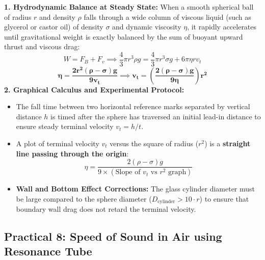 \documentclass[10pt,twoside,openright]{book}
\begin{document}
\begin{conceptbox}
\textbf{1. Hydrodynamic Balance at Steady State:}
When a smooth spherical ball of radius $r$ and density $\rho$ falls through a wide column of viscous liquid (such as glycerol or castor oil) of density $\sigma$ and dynamic viscosity $\eta$, it rapidly accelerates until gravitational weight is exactly balanced by the sum of buoyant upward thrust and viscous drag:
\begin{equation}
  W = F_B + F_v \implies \frac{4}{3}\pi r^3 \rho g = \frac{4}{3}\pi r^3 \sigma g + 6\pi \eta r v_t
\end{equation}
\begin{equation}
  \mathbf{\eta = \frac{2 r^2 (\rho - \sigma) g}{9 v_t}} \implies \mathbf{v_t = \left(\frac{2(\rho - \sigma)g}{9\eta}\right)r^2}
\end{equation}
\textbf{2. Graphical Calculus and Experimental Protocol:}
\begin{itemize}
  \item The fall time between two horizontal reference marks separated by vertical distance $h$ is timed after the sphere has traversed an initial lead-in distance to ensure steady terminal velocity $v_t = h/t$.
  \item A plot of terminal velocity $v_t$ versus the square of radius ($r^2$) is a \textbf{straight line passing through the origin}:
  \begin{equation}
    \eta = \frac{2(\rho - \sigma)g}{9 \times (\text{Slope of } v_t \text{ vs } r^2 \text{ graph})}
  \end{equation}
  \item \textbf{Wall and Bottom Effect Corrections:} The glass cylinder diameter must be large compared to the sphere diameter ($D_{\text{cylinder}} > 10\cdot r$) to ensure that boundary wall drag does not retard the terminal velocity.
\end{itemize}
\end{conceptbox}

\subsection{Practical 8: Speed of Sound in Air using Resonance Tube}
\end{document}
